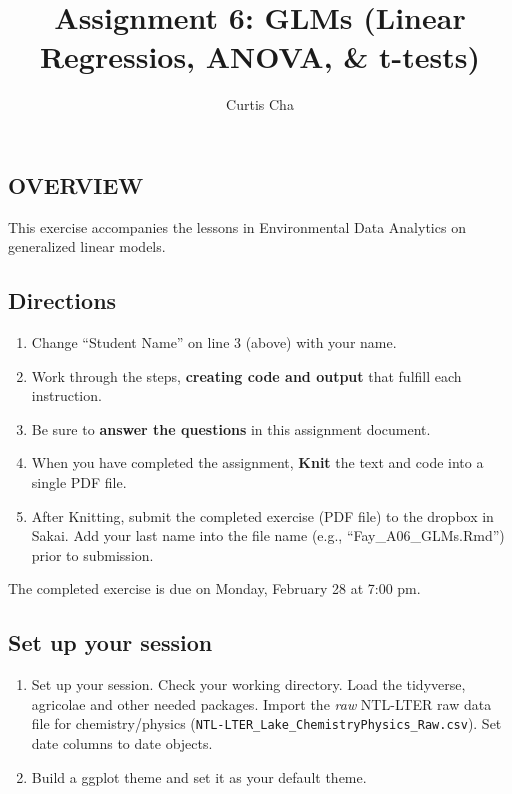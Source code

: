\documentclass[
]{article}
\title{Assignment 6: GLMs (Linear Regressios, ANOVA, \& t-tests)}
\author{Curtis Cha}
\date{}
\providecommand{\tightlist}{%
  \setlength{\itemsep}{0pt}\setlength{\parskip}{0pt}}
\begin{document}
\maketitle

\hypertarget{overview}{%
\subsection{OVERVIEW}\label{overview}}

This exercise accompanies the lessons in Environmental Data Analytics on
generalized linear models.

\hypertarget{directions}{%
\subsection{Directions}\label{directions}}

\begin{enumerate}
\def\labelenumi{\arabic{enumi}.}
\tightlist
\item
  Change ``Student Name'' on line 3 (above) with your name.
\item
  Work through the steps, \textbf{creating code and output} that fulfill
  each instruction.
\item
  Be sure to \textbf{answer the questions} in this assignment document.
\item
  When you have completed the assignment, \textbf{Knit} the text and
  code into a single PDF file.
\item
  After Knitting, submit the completed exercise (PDF file) to the
  dropbox in Sakai. Add your last name into the file name (e.g.,
  ``Fay\_A06\_GLMs.Rmd'') prior to submission.
\end{enumerate}

The completed exercise is due on Monday, February 28 at 7:00 pm.

\hypertarget{set-up-your-session}{%
\subsection{Set up your session}\label{set-up-your-session}}

\begin{enumerate}
\def\labelenumi{\arabic{enumi}.}
\item
  Set up your session. Check your working directory. Load the tidyverse,
  agricolae and other needed packages. Import the \emph{raw} NTL-LTER
  raw data file for chemistry/physics
  (\texttt{NTL-LTER\_Lake\_ChemistryPhysics\_Raw.csv}). Set date columns
  to date objects.
\item
  Build a ggplot theme and set it as your default theme.
\end{enumerate}
\end{document}
